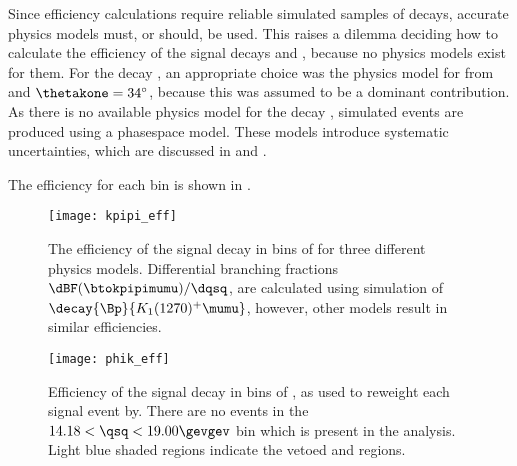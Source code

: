 



Since efficiency calculations require reliable simulated samples of decays, accurate physics
models must, or should, be used.
This raises a dilemma deciding how to calculate the efficiency of the signal decays \btokpipimumu
and \btophikmumu, because no physics models exist for them.
For the decay \btokpipimumu, an appropriate choice
was the physics model for 
from  and $\thetakone=34^\circ$, because this was assumed to be a dominant
contribution.
As there is no available physics model for the decay \btophikmumu, simulated events are produced
using a phasespace model.
These models introduce systematic uncertainties, which are discussed in  and
.


The efficiency for each \qsq bin is shown in .

\begin{figure}
  \begin{center}
    \texttt{[image: kpipi\_eff]}
    \caption{\small
      The efficiency of the signal decay \btokpipimumu in bins of \qsq for three different physics
      models.
      Differential branching fractions $\dBF(\btokpipimumu)/\dqsq$, are calculated using simulation
      of $\decay{\Bp}{K_1(1270)^+\mumu}$, however, other models result in similar efficiencies.
    }
    \label{fig:hhh:kpipieff}
  \end{center}
\end{figure}

\begin{figure}
  \begin{center}
    \texttt{[image: phik\_eff]}
    \caption{\small
      Efficiency of the signal decay \btokphimumu in bins of \qsq, as used to reweight each
      signal event by.
      There are no events in the $14.18<\qsq<19.00\gevgev$ bin which is present in the
      \btokpipimumu analysis.
      Light blue shaded regions indicate the vetoed \jpsi and \psitwos regions.
    }
    \label{fig:hhh:phikeff}
  \end{center}
\end{figure}




